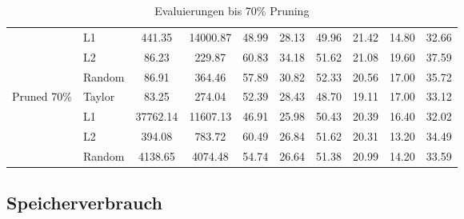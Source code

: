 \begin{table}[h]
{\begin{tabular}{l l | c c | c c c c c | r}
			                             & L1              & 441.35             & 14000.87
			                             & 48.99           & 28.13              & 49.96
			                             & 21.42           & 14.80              & 32.66            \\


			                             & L2              & 86.23              & 229.87
			                             & 60.83           & 34.18              & 51.62
			                             & 21.08           & 19.60              & 37.59            \\


			                             & Random          & 86.91              & 364.46
			                             & 57.89           & 30.82              & 52.33
			                             & 20.56           & 17.00              & 35.72            \\

			\midrule
			\multirow{4}{*}{Pruned 70\%} & Taylor          & 83.25              & 274.04
			                             & 52.39           & 28.43              & 48.70
			                             & 19.11           & 17.00              & 33.12            \\

			                             & L1              & 37762.14           & 11607.13
			                             & 46.91           & 25.98              & 50.43
			                             & 20.39           & 16.40              & 32.02            \\


			                             & L2              & 394.08             & 783.72
			                             & 60.49           & 26.84              & 51.62
			                             & 20.31           & 13.20              & 34.49            \\


			                             & Random          & 4138.65            & 4074.48
			                             & 54.74           & 26.64              & 51.38
			                             & 20.99           & 14.20              & 33.59            \\
			\bottomrule
			\bottomrule
		\end{tabular}}
	\caption{Evaluierungen bis 70\% Pruning}
	\label{tab:pruning70}
\end{table}

\newpage
\subsection{Speicherverbrauch}


